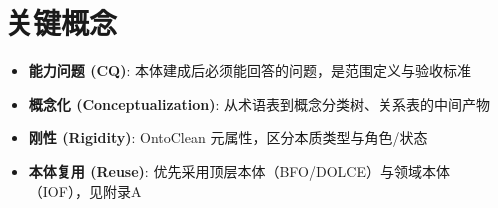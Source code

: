 \section{关键概念}

\begin{itemize}
\item \textbf{能力问题 (CQ)}: 本体建成后必须能回答的问题，是范围定义与验收标准
\item \textbf{概念化 (Conceptualization)}: 从术语表到概念分类树、关系表的中间产物
\item \textbf{刚性 (Rigidity)}: OntoClean 元属性，区分本质类型与角色/状态
\item \textbf{本体复用 (Reuse)}: 优先采用顶层本体（BFO/DOLCE）与领域本体（IOF），见附录A
\end{itemize}

